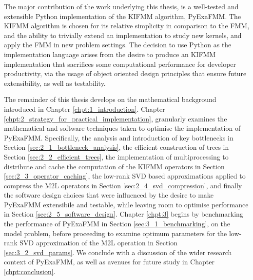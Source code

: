 The major contribution of the work underlying this thesis, is a well-tested and
extensible Python implementation of the \gls{KIFMM} algorithm, \gls{PyExaFMM}. The \gls{KIFMM}
algorithm is chosen for its relative simplicity in comparison to the \gls{FMM},
and the ability to trivially extend an implementation to study new kernels, and
apply the \gls{FMM} in new problem settings. The decision to use Python as the implementation language arises from the desire
to produce an \gls{KIFMM} implementation that sacrifices some computational
performance for developer productivity, via the usage of object oriented design
principles that ensure future extensibility, as well as testability.

The remainder of this thesis develops on the mathematical background introduced in Chapter \ref{chpt:1_introduction}.
Chapter \ref{chpt:2_strategy_for_practical_implementation}, granularly examines
the mathematical and software techniques taken to optimise the implementation of
\gls{PyExaFMM}. Specifically, the analysis and introduction of key bottlenecks in Section \ref{sec:2_1_bottleneck_analysis},
the efficient construction of trees in Section \ref{sec:2_2_efficient_trees}, the implementation
of multiprocessing to distribute and cache the computation of the \gls{KIFMM}
operators in Section \ref{sec:2_3_operator_caching}, the low-rank SVD based
approximations applied to compress the \gls{M2L} operators in Section \ref{sec:2_4_svd_compression},
and finally the software design choices that were influenced by the desire to
make \gls{PyExaFMM} extensibile and testable, while leaving room to optimise
performance in Section \ref{sec:2_5_software_design}. Chapter \ref{chpt:3} begins
by benchmarking the performance of \gls{PyExaFMM} in Section \ref{sec:3_1_benchmarking},
on the model problem, before proceeding to examine optimum parameters for the
low-rank SVD approximation of the \gls{M2L} operation in Section \ref{sec:3_2_svd_params}.
We conclude with a discussion of the wider research context of \gls{PyExaFMM},
as well as avenues for future study in Chapter \ref{chpt:conclusion}.
